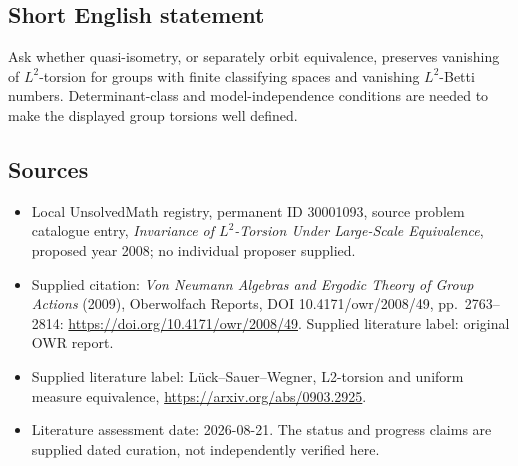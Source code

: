 \documentclass[11pt]{article}
\begin{document}
\subsection{Short English statement}
Ask whether quasi-isometry, or separately orbit equivalence, preserves vanishing of $L^2$-torsion for groups with finite classifying spaces and vanishing $L^2$-Betti numbers. Determinant-class and model-independence conditions are needed to make the displayed group torsions well defined.
\subsection{Sources}
\begin{itemize}\item Local UnsolvedMath registry, permanent ID 30001093, source problem catalogue entry, \emph{Invariance of $L^2$-Torsion Under Large-Scale Equivalence}, proposed year 2008; no individual proposer supplied.\item Supplied citation: \emph{Von Neumann Algebras and Ergodic Theory of Group Actions} (2009), Oberwolfach Reports, DOI 10.4171/owr/2008/49, pp.\ 2763--2814: \url{https://doi.org/10.4171/owr/2008/49}. Supplied literature label: original OWR report.\item Supplied literature label: L\"uck--Sauer--Wegner, L2-torsion and uniform measure equivalence, \url{https://arxiv.org/abs/0903.2925}.\item Literature assessment date: 2026-08-21. The status and progress claims are supplied dated curation, not independently verified here.\end{itemize}
\end{document}
